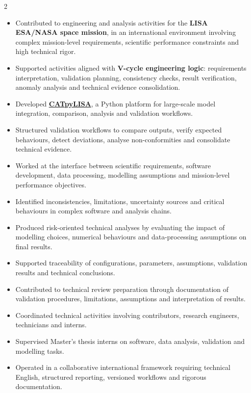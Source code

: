 \documentclass[8pt,a4paper,ragged2e,withhyper]{altacv}
\begin{document}
\begin{paracol}{2}
\begin{itemize}
\item Contributed to engineering and analysis activities for the \textbf{LISA ESA/NASA space mission}, in an international environment involving complex mission-level requirements, scientific performance constraints and high technical rigor.
\item Supported activities aligned with \textbf{V-cycle engineering logic}: requirements interpretation, validation planning, consistency checks, result verification, anomaly analysis and technical evidence consolidation.
\item Developed \textcolor{DarkPastelRed}{\href{https://gitlab.oca.eu/gboileau/lisa_l3_tools}{\bf CATpyLISA}}, a Python platform for large-scale model integration, comparison, analysis and validation workflows.
\item Structured validation workflows to compare outputs, verify expected behaviours, detect deviations, analyse non-conformities and consolidate technical evidence.
\item Worked at the interface between scientific requirements, software development, data processing, modelling assumptions and mission-level performance objectives.
\item Identified inconsistencies, limitations, uncertainty sources and critical behaviours in complex software and analysis chains.
\item Produced risk-oriented technical analyses by evaluating the impact of modelling choices, numerical behaviours and data-processing assumptions on final results.
\item Supported traceability of configurations, parameters, assumptions, validation results and technical conclusions.
\item Contributed to technical review preparation through documentation of validation procedures, limitations, assumptions and interpretation of results.
\item Coordinated technical activities involving contributors, research engineers, technicians and interns.
\item Supervised Master's thesis interns on software, data analysis, validation and modelling tasks.
\item Operated in a collaborative international framework requiring technical English, structured reporting, versioned workflows and rigorous documentation.
\end{itemize}

\divider


\end{paracol}
\end{document}
